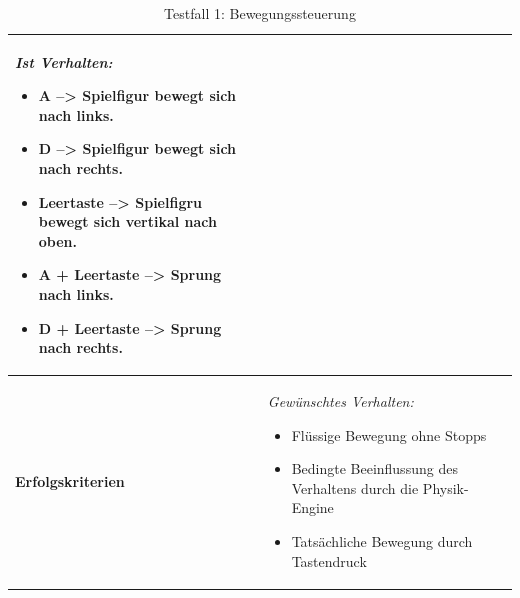 \begin{table}
\begin{tabular}{|p{3.5cm}|p{11cm}|}
	
	\textit{Ist Verhalten:}
	\begin{itemize}
		\setlength{\itemsep}{1pt}
		\setlength{\parskip}{0.5pt}
		\item A --> Spielfigur bewegt sich nach links.
		\item D --> Spielfigur bewegt sich nach rechts.
		\item Leertaste --> Spielfigru bewegt sich vertikal nach oben.
		\item 	A + Leertaste --> Sprung nach links.
		\item D + Leertaste --> Sprung nach rechts.
	\end{itemize}\\ 
	\hline 
	\textbf{Erfolgskriterien} & 
	\textit{Gewünschtes Verhalten:}
	\begin{itemize}
		\setlength{\itemsep}{1pt}
		\setlength{\parskip}{0.5pt}
		\item Flüssige Bewegung ohne Stopps
		\item Bedingte Beeinflussung des Verhaltens durch die Physik-Engine
		\item Tatsächliche Bewegung durch Tastendruck
	\end{itemize} \\ 
	\hline 
\end{tabular} 
\caption{Testfall 1: Bewegungssteuerung}
\end{table}

